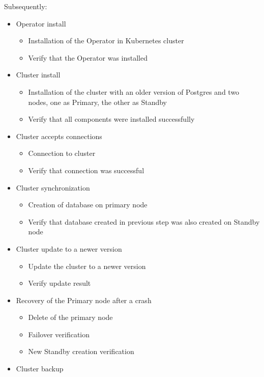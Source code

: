 Subsequently:
\begin{itemize}
  \item Operator install
        \begin{itemize}
          \item Installation of the Operator in Kubernetes cluster
          \item Verify that the Operator was installed
        \end{itemize}
  \item Cluster install
        \begin{itemize}
          \item Installation of the cluster with an older version of Postgres and two nodes, one as Primary, the other as Standby
          \item Verify that all components were installed successfully
        \end{itemize}
  \item Cluster accepts connections
        \begin{itemize}
          \item Connection to cluster
          \item Verify that connection was successful
        \end{itemize}
  \item Cluster synchronization
        \begin{itemize}
          \item Creation of database on primary node
          \item Verify that database created in previous step was also created on Standby node
        \end{itemize}
  \item Cluster update to a newer version
        \begin{itemize}
          \item Update the cluster to a newer version
          \item Verify update result
        \end{itemize}
  \item Recovery of the Primary node after a crash
        \begin{itemize}
          \item Delete of the primary node
          \item Failover verification
          \item New Standby creation verification
        \end{itemize}
  \item Cluster backup

\end{itemize}
